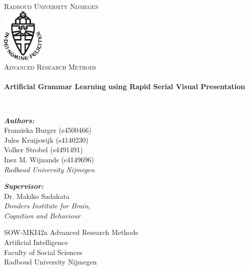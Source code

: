 \begin{titlepage}
\begin{center}

\textsc{\LARGE Radboud University Nijmegen}\\[1cm]

\includegraphics[width=0.15\textwidth]{media/ru-logo}~\\[1cm]

\textsc{\Large Advanced Research Methods}\\[0.6cm]

\HRule \\[0.4cm]
{ \huge \bfseries Artificial Grammar Learning using Rapid Serial Visual Presentation \\[0.4cm] }

\HRule \\[1.2cm]

\begin{flushleft} \large
\emph{\textbf{Authors:}}\\
Franziska Burger (s4500466)\\
Jules Kruijswijk (s4140230)\\
Volker Strobel (s4491491)\\
Inez M. Wijnands (s4149696)\\
\emph{Radboud University Nijmegen}\\
\end{flushleft}
\begin{flushleft} \large
\emph{\textbf{Supervisor:}} \\
Dr. Makiko Sadakata\\
\emph{Donders Institute for Brain,\\
Cognition and Behaviour}\\
\end{flushleft}


\vfill

SOW-MKI42a Advanced Research Methods\\
Artificial Intelligence\\
Faculty of Social Sciences\\
Radboud University Nijmegen\\
\vspace{0.2cm}
\date{\large\today} %

\end{center}
\end{titlepage}